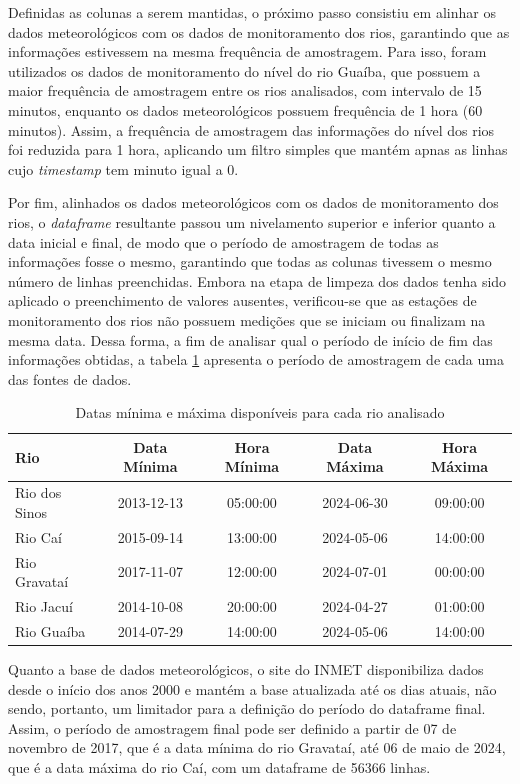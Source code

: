 Definidas as colunas a serem mantidas, o próximo passo consistiu em alinhar os dados meteorológicos com os dados de monitoramento dos rios, garantindo que as informações estivessem na mesma frequência de amostragem. Para isso, foram utilizados os dados de monitoramento do nível do rio Guaíba, que possuem a maior frequência de amostragem entre os rios analisados, com intervalo de 15 minutos, enquanto os dados meteorológicos possuem frequência de 1 hora (60 minutos). Assim, a frequência de amostragem das informações do nível dos rios foi reduzida para 1 hora, aplicando um filtro simples que mantém apnas as linhas cujo \textit{timestamp} tem minuto igual a 0.

Por fim, alinhados os dados meteorológicos com os dados de monitoramento dos rios, o \textit{dataframe} resultante passou um nivelamento superior e inferior quanto a data inicial e final, de modo que o período de amostragem de todas as informações fosse o mesmo, garantindo que todas as colunas tivessem o mesmo número de linhas preenchidas. Embora na etapa de limpeza dos dados tenha sido aplicado o preenchimento de valores ausentes, verificou-se que as estações de monitoramento dos rios não possuem medições que se iniciam ou finalizam na mesma data. Dessa forma, a fim de analisar qual o período de início de fim das informações obtidas, a tabela \ref{tab:periodo_amostragem} apresenta o período de amostragem de cada uma das fontes de dados.
\begin{table}[H]
	\centering
	\begin{tabular}{|l|c|c|c|c|}
	\hline
	\textbf{Rio} & \textbf{Data Mínima} & \textbf{Hora Mínima} & \textbf{Data Máxima} & \textbf{Hora Máxima} \\
	\hline
	Rio dos Sinos & 2013-12-13 & 05:00:00 & 2024-06-30 & 09:00:00 \\
	Rio Caí       & 2015-09-14 & 13:00:00 & 2024-05-06 & 14:00:00 \\
	Rio Gravataí  & 2017-11-07 & 12:00:00 & 2024-07-01 & 00:00:00 \\
	Rio Jacuí     & 2014-10-08 & 20:00:00 & 2024-04-27 & 01:00:00 \\
	Rio Guaíba    & 2014-07-29 & 14:00:00 & 2024-05-06 & 14:00:00 \\
	\hline
	\end{tabular}
	\caption{Datas mínima e máxima disponíveis para cada rio analisado}
	\label{tab:periodo_amostragem}
\end{table}

Quanto a base de dados meteorológicos, o site do INMET disponibiliza dados desde o início dos anos 2000 e mantém a base atualizada até os dias atuais, não sendo, portanto, um limitador para a definição do período do dataframe final. Assim, o período de amostragem final pode ser definido a partir de 07 de novembro de 2017, que é a data mínima do rio Gravataí, até 06 de maio de 2024, que é a data máxima do rio Caí, com um dataframe de 56366 linhas.

